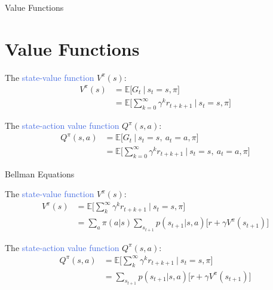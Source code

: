 \documentclass{beamer}
\begin{document}


\begin{frame}{Value Functions}
\section{Value Functions}

The \textcolor{RoyalBlue}{state-value function} $V^{\pi}(s)$:
\begin{align*}
	V^{\pi}(s) & = \mathds{E} \bigg[G_t \: \big| \: s_t=s,\pi \bigg] \\ 
		& = \mathds{E} \bigg[\sum_{k=0}^{\infty}\gamma^{k} r_{t+k+1} \: \bigg| \: s_t=s,\pi \bigg]
\end{align*}

The \textcolor{RoyalBlue}{state-action value function} $Q^{\pi}(s,a)$:
\begin{align*}
	Q^{\pi}(s,a) & = \mathds{E} \bigg[G_t \: \big| \: s_t=s, \: a_t=a,  \pi \bigg] \\ 
		& = \mathds{E} \bigg[\sum_{k=0}^{\infty}\gamma^{k} r_{t+k+1} \: \bigg| \: s_t=s, \: a_t=a, \pi \bigg]
\end{align*}
		
\end{frame}


\begin{frame}{Bellman Equations}

The \textcolor{RoyalBlue}{state-value function} $V^{\pi}(s)$:
\begin{align*}
			V^{\pi}(s) & = \mathds{E} \bigg[\sum_{k}^{\infty}\gamma^{k} r_{t+k+1} \: \bigg| \: s_t=s,\pi \bigg] \\
			   & = \sum_a \pi(a|s) \sum_{s_{t+1}} p(s_{t+1}|s,a)\big[r + \gamma V^{\pi}(s_{t+1}) \big] 
		\end{align*}

The \textcolor{RoyalBlue}{state-action value function} $Q^{\pi}(s,a)$:
\begin{align*}
	Q^{\pi}(s,a) & = \mathds{E} \bigg[\sum_{k}^{\infty}\gamma^{k} r_{t+k+1} \: \bigg| \: s_t=s,\pi \bigg] \\
			   & = \sum_{s_{t+1}} p(s_{t+1}|s,a)\big[r + \gamma V^{\pi}(s_{t+1}) \big] %
\end{align*}
		
\end{frame}
\end{document}
